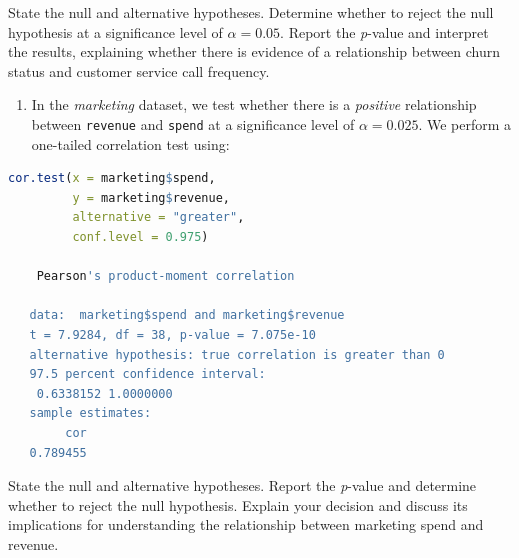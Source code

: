 \documentclass[
  11pt,
]{book}
\newcommand{\passthrough}[1]{#1}
\providecommand{\tightlist}{%
  \setlength{\itemsep}{0pt}\setlength{\parskip}{0pt}}
\theoremstyle{definition}
\theoremstyle{definition}
\theoremstyle{definition}
\theoremstyle{definition}
\theoremstyle{remark}
\begin{document}
State the null and alternative hypotheses. Determine whether to reject the null hypothesis at a significance level of \(\alpha=0.05\). Report the \emph{p}-value and interpret the results, explaining whether there is evidence of a relationship between churn status and customer service call frequency.

\begin{enumerate}
\def\labelenumi{\arabic{enumi}.}
\setcounter{enumi}{14}
\tightlist
\item
  In the \emph{marketing} dataset, we test whether there is a \emph{positive} relationship between \passthrough{\lstinline!revenue!} and \passthrough{\lstinline!spend!} at a significance level of \(\alpha = 0.025\). We perform a one-tailed correlation test using:
\end{enumerate}

\begin{lstlisting}[language=R]
cor.test(x = marketing$spend, 
         y = marketing$revenue, 
         alternative = "greater", 
         conf.level = 0.975)
   
    Pearson's product-moment correlation
   
   data:  marketing$spend and marketing$revenue
   t = 7.9284, df = 38, p-value = 7.075e-10
   alternative hypothesis: true correlation is greater than 0
   97.5 percent confidence interval:
    0.6338152 1.0000000
   sample estimates:
        cor 
   0.789455
\end{lstlisting}

State the null and alternative hypotheses. Report the \emph{p}-value and determine whether to reject the null hypothesis. Explain your decision and discuss its implications for understanding the relationship between marketing spend and revenue.
\end{document}
